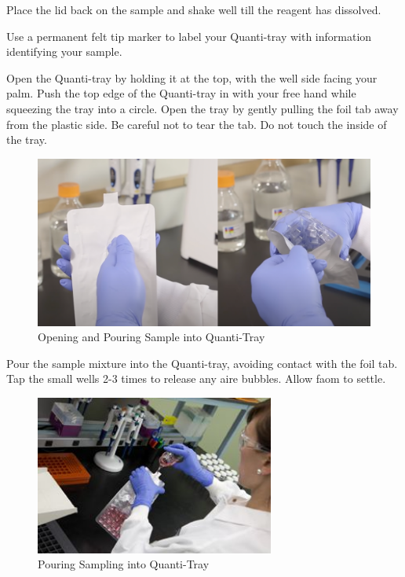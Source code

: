 \documentclass[12pt]{../SOP4_alpha}\usepackage[]{graphicx}\usepackage[]{xcolor}
\begin{document}
\NP Place the lid back on the sample and shake well till the reagent has dissolved.

\NP Use a permanent felt tip marker to label your Quanti-tray with information identifying your sample. 

\NP Open the Quanti-tray by holding it at the top, with the well side facing your palm. Push the top edge of the Quanti-tray in with your free hand while squeezing the tray into a circle. Open the tray by gently pulling the foil tab away from the plastic side. Be careful not to tear the tab. Do not touch the inside of the tray. 

\begin{figure}
\includegraphics[width=1\textwidth]{figures/OpeningQuanti-Tray.png}
\caption{Opening and Pouring Sample into Quanti-Tray}
\label{fig:Adding Reagent}
\end{figure}

\clearpage

\NP Pour the sample mixture into the Quanti-tray, avoiding contact with the foil tab. Tap the small wells 2-3 times to release any aire bubbles. Allow faom to settle.

\begin{figure}
\includegraphics[width=0.7\textwidth]{figures/Step2.jpg}
\caption{Pouring Sampling into Quanti-Tray}
\end{figure}
\end{document}
